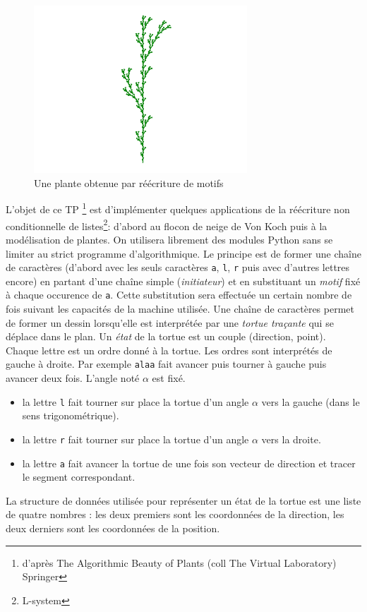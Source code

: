 
\begin{figure}
 \centering
 \includegraphics[width=8cm]{Ereecriture_1.pdf}
 \caption{Une plante obtenue par réécriture de motifs}
 \label{fig:Ereecriture_1}
\end{figure}

L'objet de ce TP \footnote{d'après The Algorithmic Beauty of Plants (coll The Virtual Laboratory) Springer} est d'implémenter quelques applications de la réécriture non conditionnelle de listes\footnote{L-system}: d'abord au flocon de neige de Von Koch puis à la modélisation de plantes.\newline
On utilisera librement des modules Python sans se limiter au strict programme d'algorithmique. \newline
Le principe est de former une chaîne de caractères (d'abord avec les seuls caractères \verb|a|, \verb|l|, \verb|r| puis avec d'autres lettres encore) en partant d'une chaîne simple (\emph{initiateur}) et en substituant un \emph{motif} fixé à chaque occurence de \verb|a|. Cette substitution sera effectuée un certain nombre de fois suivant les capacités de la machine utilisée.\newline
Une chaîne de caractères permet de former un dessin lorsqu'elle est interprétée par une \emph{tortue traçante} qui se déplace dans le plan. Un \emph{état} de la tortue est un couple (direction, point).\newline
Chaque lettre est un ordre donné à la tortue. Les ordres sont interprétés de gauche à droite. Par exemple \verb|alaa| fait avancer puis tourner à gauche puis avancer deux fois. L'angle noté $\alpha$ est fixé.
\begin{itemize}
 \item la lettre \verb|l|  fait tourner sur place la tortue d'un angle $\alpha$ vers la gauche (dans le sens trigonométrique).
\item la lettre \verb|r|  fait tourner sur place la tortue d'un angle $\alpha$ vers la droite.
\item la lettre \verb|a|  fait avancer  la tortue de une fois son vecteur de direction et tracer le segment correspondant.
\end{itemize}
La structure de données utilisée pour représenter un état de la tortue est une liste de quatre nombres : les deux premiers sont les coordonnées de la direction, les deux derniers sont les coordonnées de la position.
